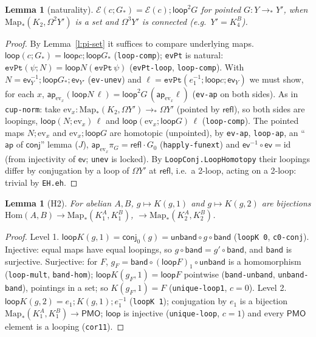 \documentclass[11pt]{amsart}
\newtheorem{lemma}[theorem]{Lemma}
\theoremstyle{definition}
\theoremstyle{remark}
\newcommand{\Om}{\Omega}
\newcommand{\Map}{\mathrm{Map}_*}
\newcommand{\code}[1]{\texttt{#1}}
\newcommand{\refl}{\mathsf{refl}}
\newcommand{\ev}{\mathsf{ev}}
\newcommand{\lp}{\mathsf{loop}}
\newcommand{\Hom}{\mathrm{Hom}}
\newcommand{\PMO}{\mathsf{PMO}}
\begin{document}
\begin{lemma}[naturality]\label{l:E-nat}
$\mathcal E(c;G_*)=\mathcal E(c);\lp^2G$ for pointed $G:Y\to_*Y'$, when
$\Map(K_2,\Om^2Y')$ is a set and $\Om^3Y'$ is connected (e.g.\ $Y'=K^{B}_4$).
\end{lemma}
\begin{proof}
By Lemma~\ref{l:pi-set} it suffices to compare underlying maps.
$\lp(c;G_*)=\lp c;\lp G_*$ (\code{loop-comp}); \code{evPt} is natural:
$\code{evPt}(\psi;N)=\lp N(\code{evPt}\,\psi)$ (\code{evPt-loop},
\code{loop-comp}). With $N=\ev_Y^{-1};\lp G_*;\ev_{Y'}$ (\code{ev-unev})
and $\ell=\code{evPt}(e_1^{-1};\lp c;\ev_Y)$ we must show, for each $x$,
$\mathsf{ap}_{\mathrm{ev}_x}(\lp N\,\ell)=\lp^2G\,(\mathsf{ap}_{\mathrm{ev}_x}\ell)$
(\code{ev-ap} on both sides). As in \code{cup-norm}: take
$\mathrm{ev}_x:\Map(K_2,\Om Y')\to_*\Om Y'$ (pointed by $\refl$), so both sides
are loopings, $\lp(N;\mathrm{ev}_x)\,\ell$ and $\lp(\mathrm{ev}_x;\lp G)\,\ell$
(\code{loop-comp}). The pointed maps $N;\mathrm{ev}_x$ and
$\mathrm{ev}_x;\lp G$ are homotopic (unpointed), by \code{ev-ap},
\code{loop-ap}, an ``$\mathsf{ap}$ of $\mathsf{conj}$'' lemma ($J$),
$\mathsf{ap}_{\mathrm{ev}_x}\pi_G=\refl\cdot G_0$ (\code{happly-funext}) and
$\ev^{-1}\circ\ev=\mathrm{id}$ (from injectivity of $\ev$; \code{unev} is
locked). By \code{LoopConj.LoopHomotopy} their loopings differ by
conjugation by a loop of $\Om Y'$ at $\refl$, i.e.\ a 2-loop, acting on a
2-loop: trivial by \code{EH.eh}.
\end{proof}

\begin{lemma}[H2]\label{l:H2}
For abelian $A,B$, $g\mapsto K(g,1)$ and $g\mapsto K(g,2)$ are bijections
$\Hom(A,B)\to\Map(K^A_1,K^B_1)$, $\to\Map(K^A_2,K^B_2)$.
\end{lemma}
\begin{proof}
Level 1. $\lp K(g,1)=\mathsf{conj}_0(g)=\mathsf{unband}\circ g\circ\mathsf{band}$
(\code{loopK 0}, \code{c0-conj}). Injective: equal maps have equal loopings,
so $g\circ\mathsf{band}=g'\circ\mathsf{band}$, and $\mathsf{band}$ is surjective.
Surjective: for $F$, $g_F=\mathsf{band}\circ(\lp F)_1\circ\mathsf{unband}$ is a
homomorphism (\code{loop-mult}, \code{band-hom}); $\lp K(g_F,1)=\lp F$
pointwise (\code{band-unband}, \code{unband-band}), pointings in a set;
so $K(g_F,1)=F$ (\code{unique-loop1}, $c=0$).
Level 2. $\lp K(g,2)=e_1;K(g,1);e_1^{-1}$ (\code{loopK 1}); conjugation by
$e_1$ is a bijection $\Map(K^A_1,K^B_1)\to\PMO$; $\lp$ is injective
(\code{unique-loop}, $c=1$) and every $\PMO$ element is a looping
(\code{cor11}).
\end{proof}
\end{document}
